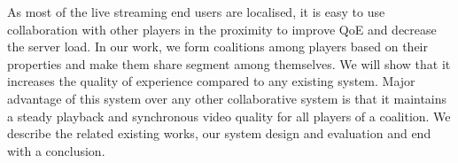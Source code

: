 As most of the live streaming end users are localised, it is easy to use collaboration with other players in the proximity to improve QoE and decrease the server load. In our work, we form coalitions among players based on their properties and make them share segment among themselves. We will show that it increases the quality of experience compared to any existing system. Major advantage of this system over any other collaborative system is that it maintains a steady playback and synchronous video quality for all players of a coalition. We describe the related existing works, our system design and evaluation and end with a conclusion.
\fi 




